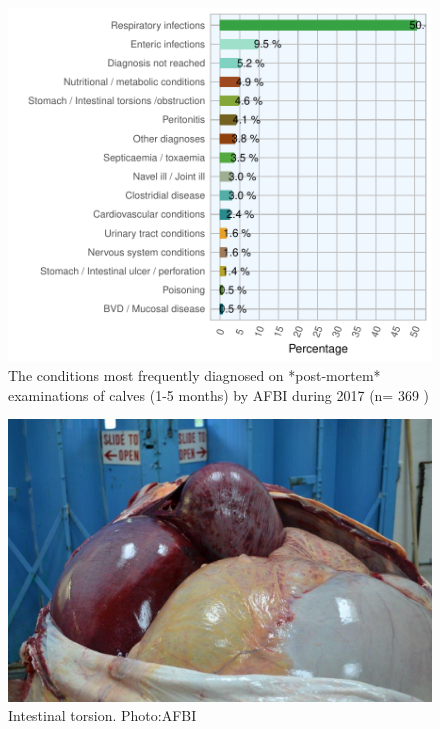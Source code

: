 \documentclass[]{book}
\begin{document}
\begin{figure}

{\centering \includegraphics{AFBI_files/figure-latex/unnamed-chunk-11-1} 

}

\caption{The conditions most frequently diagnosed on *post-mortem* examinations of calves (1-5 months) by AFBI during 2017 (n= 369 )}\label{fig:unnamed-chunk-11}
\end{figure}

\begin{figure}

{\centering \includegraphics[width=14.22in]{_images/Torsion} 

}

\caption{Intestinal torsion. Photo:AFBI}\label{fig:torsion}
\end{figure}
\end{document}
